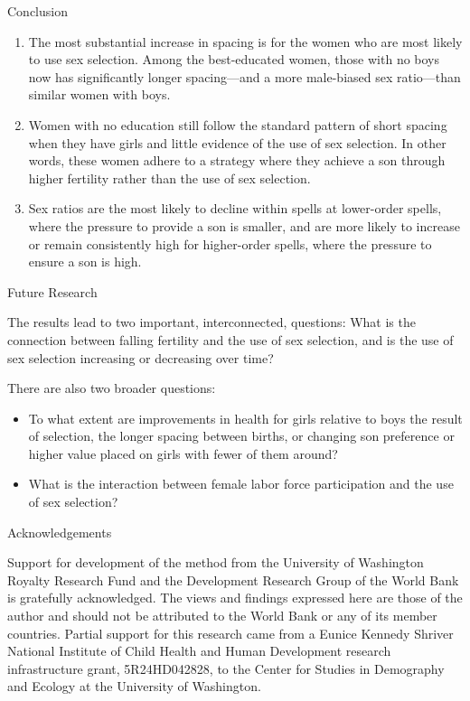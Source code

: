 \documentclass[final]{beamer}
\newlength{\onecolwid}
\begin{document}
\begin{frame}{}
\begin{columns}[t]
\begin{column}{\onecolwid}
\begin{alertblock}{Conclusion}
\begin{enumerate}
\item The most substantial increase in spacing is for the women who
are most likely to use sex selection.
Among the best-educated women, those with no boys now has 
significantly longer spacing---and a more male-biased sex ratio---than 
similar women with boys.

\item Women with no education still follow the standard pattern of
short spacing when they have girls and little evidence of the use of sex
selection.
In other words, these women adhere to a strategy where they achieve a
son through higher fertility rather than the use of sex selection.

\item Sex ratios are the most likely to decline within spells at
lower-order spells, where the pressure to provide a son is smaller, and
are more likely to increase or remain consistently high for higher-order
spells, where the pressure to ensure a son is high.

\end{enumerate}

\end{alertblock}

\begin{block}{Future Research}

The results lead to two important, interconnected, questions:
What is the connection between falling fertility and the 
use of sex selection, and is the use of sex selection increasing 
or decreasing over time?

\bigskip

There are also two broader questions:
\begin{itemize}
\item To what extent are improvements in health for girls
relative to boys the result of selection, the longer spacing between
births, or changing son preference or higher value placed on girls
with fewer of them around?
\item What is the interaction between female labor force participation
and the use of sex selection?
\end{itemize}

\end{block}

\begin{block}{Acknowledgements}

Support for development of the method from the University of Washington Royalty 
Research Fund and the Development Research Group of the World Bank is gratefully 
acknowledged.
The views and findings expressed here are those of the author and
should not be attributed to the World Bank or any of its member countries.
Partial support for this research came from a Eunice Kennedy Shriver National
Institute of Child Health and Human Development research infrastructure grant,
5R24HD042828, to the Center for Studies in Demography and Ecology at the
University of Washington.


\end{block}
\end{column}
\end{columns}
\end{frame}
\end{document}
